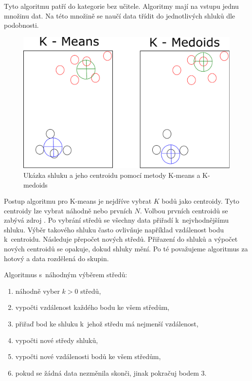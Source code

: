 \documentclass[thesis=M,czech]{FITthesis}[2012/10/20]
\newcommand{\tmpframe}[1]{\fbox{#1}}
\renewcommand{\tmpframe}[1]{#1}
\begin{document}
			Tyto algoritmu patří do kategorie bez učitele. Algoritmy mají na vstupu jednu množinu dat. Na této množině se naučí data třídit do jednotlivých shluků dle podobnosti.
			
			\begin{figure}[htb]\centering
				\tmpframe{\includegraphics[width=\textwidth]{./img/kmeansVSkmedoids}}		
				\caption{Ukázka shluku a jeho centroidu pomocí metody K-means a K-medoids}
				\label{fig:kMeansVSkMedoids}
			\end{figure}
		
			Postup algoritmu pro K-means je nejdříve vybrat $K$ bodů jako centroidy. Tyto centroidy lze vybrat náhodně nebo prvních $N$. Volbou prvních centroidů se zabývá zdroj \cite{kMeansInit}. Po vybrání středů se všechny data přiřadí k~nejvhodnějšímu shluku. Výběr takového shluku často ovlivňuje například vzdálenost bodu k~centroidu. Následuje přepočet nových středů. Přiřazení do shluků a výpočet nových centroidů se opakuje, dokud shluky mění. Po té považujeme algoritmus za hotový a data rozdělená do skupin.
			
			Algoritmus s~náhodným výběrem středů:
			
			\begin{enumerate} 
				\item náhodně vyber $k > 0$ středů,
				\item vypočti vzdálenost každého bodu ke všem středům,
				\item přiřaď bod ke shluku k~jehož středu má nejmenší vzdálenost,
				\item vypočti nové středy shluků,
				\item vypočti nové vzdálenosti bodů ke všem středům,
				\item pokud se žádná data nezměnila skonči, jinak pokračuj bodem 3.
			\end{enumerate}
			
\end{document}
